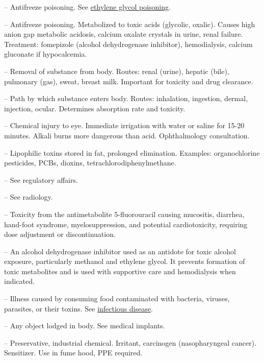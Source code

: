 -- Antifreeze poisoning. See \hyperlink{Ethylene Glycol Poisoning}{ethylene glycol poisoning}.

-- Antifreeze poisoning. Metabolized to toxic acids (glycolic, oxalic). Causes high anion gap metabolic acidosis, calcium oxalate crystals in urine, renal failure. Treatment: fomepizole (alcohol dehydrogenase inhibitor), hemodialysis, calcium gluconate if hypocalcemia.

-- Removal of substance from body. Routes: renal (urine), hepatic (bile), pulmonary (gas), sweat, breast milk. Important for toxicity and drug clearance.

-- Path by which substance enters body. Routes: inhalation, ingestion, dermal, injection, ocular. Determines absorption rate and toxicity.

-- Chemical injury to eye. Immediate irrigation with water or saline for 15-20 minutes. Alkali burns more dangerous than acid. Ophthalmology consultation.

-- Lipophilic toxins stored in fat, prolonged elimination. Examples: organochlorine pesticides, PCBs, dioxins, tetrachlorodiphenylmethane.

-- See regulatory affairs.

-- See radiology.

-- Toxicity from the antimetabolite 5-fluorouracil causing mucositis, diarrhea, hand-foot syndrome, myelosuppression, and potential cardiotoxicity, requiring dose adjustment or discontinuation.

-- An alcohol dehydrogenase inhibitor used as an antidote for toxic alcohol exposure, particularly methanol and ethylene glycol. It prevents formation of toxic metabolites and is used with supportive care and hemodialysis when indicated.

-- Illness caused by consuming food contaminated with bacteria, viruses, parasites, or their toxins. See \hyperlink{Infectious Disease}{infectious disease}.

-- Any object lodged in body. See medical implants.

-- Preservative, industrial chemical. Irritant, carcinogen (nasopharyngeal cancer). Sensitizer. Use in fume hood, PPE required.

